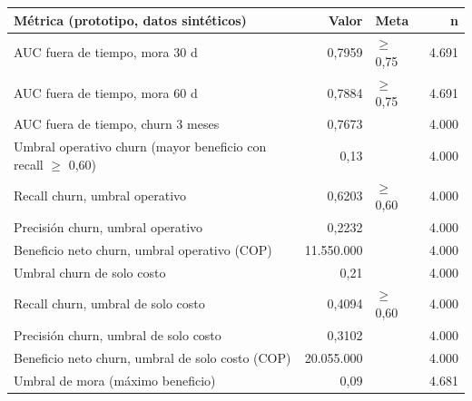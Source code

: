 \footnotesize
\begin{tabularx}{\linewidth}{X r l r}
\toprule
\textbf{Métrica (prototipo, datos sintéticos)} & \textbf{Valor} & \textbf{Meta} & \textbf{n} \\
\midrule
AUC fuera de tiempo, mora 30 d & 0,7959 & $\geq$ 0,75 & 4.691 \\
AUC fuera de tiempo, mora 60 d & 0,7884 & $\geq$ 0,75 & 4.691 \\
AUC fuera de tiempo, churn 3 meses & 0,7673 &  & 4.000 \\
Umbral operativo churn (mayor beneficio con recall $\geq$ 0,60) & 0,13 &  & 4.000 \\
Recall churn, umbral operativo & 0,6203 & $\geq$ 0,60 & 4.000 \\
Precisión churn, umbral operativo & 0,2232 &  & 4.000 \\
Beneficio neto churn, umbral operativo (COP) & 11.550.000 &  & 4.000 \\
Umbral churn de solo costo & 0,21 &  & 4.000 \\
Recall churn, umbral de solo costo & 0,4094 & $\geq$ 0,60 & 4.000 \\
Precisión churn, umbral de solo costo & 0,3102 &  & 4.000 \\
Beneficio neto churn, umbral de solo costo (COP) & 20.055.000 &  & 4.000 \\
Umbral de mora (máximo beneficio) & 0,09 &  & 4.681 \\
\bottomrule
\end{tabularx}
